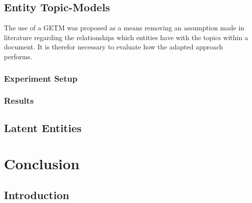 \documentclass[10pt]{report}
\begin{document}
\section{Entity Topic-Models}
The use of a GETM was proposed as a means removing an assumption made in literature regarding the relationships which entities have with the topics within a document. It is therefor necessary to evaluate how the adapted approach performs.

\subsection{Experiment Setup}

\subsection{Results}

\section{Latent Entities}

%
%
%
%
\chapter{Conclusion}
\section{Introduction}

\renewcommand{\baselinestretch}{1.0}\normalsize


\end{document}

